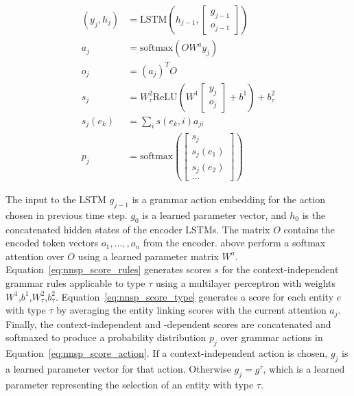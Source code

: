 \begin{align}
 (y_j, h_j) & = \text{LSTM}(h_{j-1}, \begin{bmatrix}g_{j-1} \\ 
o_{j-1}\end{bmatrix}) \label{eq:nnsp_decoder_lstm} \\
 a_j & = \text{softmax}(O W^a y_j) \label{eq:nnsp_decoder_lstm_output}\\
 o_j & = (a_j)^T O  \label{eq:nnsp_decoder_soft_att}\\
 s_j & = W^2_\tau \text{ReLU}( W^1 \begin{bmatrix}y_j \\ o_j \end{bmatrix} + 
b^1) + b^2_\tau \label{eq:nnsp_score_rules}\\
 s_j(e_k) & = \sum_i s(e_k, i) a_{ji} \label{eq:nnsp_score_type}\\
 p_j & = \text{softmax}( \begin{bmatrix} s_j \\ s_j(e_1) \\ s_j(e_2) \\\dots 
\end{bmatrix} ) \label{eq:nnsp_score_action}
\end{align}

The input to the LSTM $g_{j-1}$ is a grammar action embedding for the action 
chosen in previous time step. $g_0$ is a learned parameter vector, and $h_0$ is 
the concatenated hidden states of the encoder LSTMs. The matrix $O$ contains 
the encoded token vectors $o_1, \ldots, ,o_n$ from the encoder. 
 above perform a 
softmax attention over $O$ using a learned parameter matrix $W^a$. 
Equation~\ref{eq:nnsp_score_rules} generates scores $s$ for the 
context-independent grammar rules applicable to type $\tau$ using a multilayer 
perceptron with weights $W^1$,$b^1$,$W^2_\tau$,$b^2_\tau$. 
Equation~\ref{eq:nnsp_score_type} generates a score for each entity $e$ with 
type $\tau$ by averaging the entity linking scores with the current attention 
$a_j$. Finally, the context-independent and -dependent scores are concatenated 
and softmaxed to produce a probability distribution $p_j$ over grammar actions 
in Equation~\ref{eq:nnsp_score_action}. If a context-independent action is 
chosen, $g_{j}$ is a learned parameter vector for that action. Otherwise $g_{j} 
= g^\tau$, which is a learned parameter representing the selection of an entity 
with type $\tau$.


